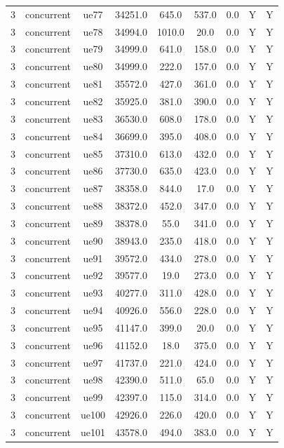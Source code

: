 \begin{table}[ht]
\begin{tabular}{|c|c|c|c|c|c|c|c|c|}
3 & concurrent & ue77 & 34251.0 & 645.0 & 537.0 & 0.0 & Y & Y \\
3 & concurrent & ue78 & 34994.0 & 1010.0 & 20.0 & 0.0 & Y & Y \\
3 & concurrent & ue79 & 34999.0 & 641.0 & 158.0 & 0.0 & Y & Y \\
3 & concurrent & ue80 & 34999.0 & 222.0 & 157.0 & 0.0 & Y & Y \\
3 & concurrent & ue81 & 35572.0 & 427.0 & 361.0 & 0.0 & Y & Y \\
3 & concurrent & ue82 & 35925.0 & 381.0 & 390.0 & 0.0 & Y & Y \\
3 & concurrent & ue83 & 36530.0 & 608.0 & 178.0 & 0.0 & Y & Y \\
3 & concurrent & ue84 & 36699.0 & 395.0 & 408.0 & 0.0 & Y & Y \\
3 & concurrent & ue85 & 37310.0 & 613.0 & 432.0 & 0.0 & Y & Y \\
3 & concurrent & ue86 & 37730.0 & 635.0 & 423.0 & 0.0 & Y & Y \\
3 & concurrent & ue87 & 38358.0 & 844.0 & 17.0 & 0.0 & Y & Y \\
3 & concurrent & ue88 & 38372.0 & 452.0 & 347.0 & 0.0 & Y & Y \\
3 & concurrent & ue89 & 38378.0 & 55.0 & 341.0 & 0.0 & Y & Y \\
3 & concurrent & ue90 & 38943.0 & 235.0 & 418.0 & 0.0 & Y & Y \\
3 & concurrent & ue91 & 39572.0 & 434.0 & 278.0 & 0.0 & Y & Y \\
3 & concurrent & ue92 & 39577.0 & 19.0 & 273.0 & 0.0 & Y & Y \\
3 & concurrent & ue93 & 40277.0 & 311.0 & 428.0 & 0.0 & Y & Y \\
3 & concurrent & ue94 & 40926.0 & 556.0 & 228.0 & 0.0 & Y & Y \\
3 & concurrent & ue95 & 41147.0 & 399.0 & 20.0 & 0.0 & Y & Y \\
3 & concurrent & ue96 & 41152.0 & 18.0 & 375.0 & 0.0 & Y & Y \\
3 & concurrent & ue97 & 41737.0 & 221.0 & 424.0 & 0.0 & Y & Y \\
3 & concurrent & ue98 & 42390.0 & 511.0 & 65.0 & 0.0 & Y & Y \\
3 & concurrent & ue99 & 42397.0 & 115.0 & 314.0 & 0.0 & Y & Y \\
3 & concurrent & ue100 & 42926.0 & 226.0 & 420.0 & 0.0 & Y & Y \\
3 & concurrent & ue101 & 43578.0 & 494.0 & 383.0 & 0.0 & Y & Y \\

\end{tabular}
\end{table}
